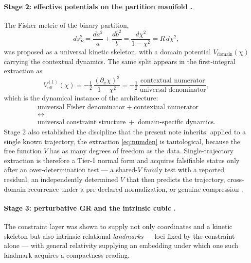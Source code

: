 \documentclass[11pt,a4paper]{article}
\theoremstyle{definition}
\theoremstyle{plain}
\theoremstyle{remark}
\newcommand{\Rresp}{R}
\newcommand{\lin}{{(1)}}
\begin{document}
\paragraph{Stage 2: effective potentials on the partition manifold \cite{EffPot}.}
The Fisher metric of the binary partition,
\begin{equation}
ds_{F}^{2}=\frac{da^{2}}{a}+\frac{db^{2}}{b}
=\frac{d\chi^{2}}{1-\chi^{2}}
=\Rresp\,d\chi^{2},
\label{eq:fisher}
\end{equation}
was proposed as a universal kinetic skeleton, with a domain potential
$V_{\mathrm{domain}}(\chi)$ carrying the contextual dynamics. The same split
appears in the first-integral extraction as
\begin{equation}
V^{\lin}_{\mathrm{eff}}(\chi)
= -\tfrac12\,\frac{(\partial_{x}\chi)^{2}}{1-\chi^{2}}
= -\tfrac12\,
\frac{\text{contextual numerator}}{\text{universal denominator}} ,
\label{eq:numden}
\end{equation}
which is the dynamical instance of the architecture:
\begin{equation}
\begin{gathered}
\text{universal Fisher denominator}\;+\;\text{contextual numerator}\\
\longleftrightarrow\\
\text{universal constraint structure}\;+\;\text{domain-specific dynamics}.
\end{gathered}
\end{equation}
Stage 2 also established the discipline that the present note inherits: applied
to a single known trajectory, the extraction \eqref{eq:numden} is tautological,
because the free function $V$ has as many degrees of freedom as the data.
Single-trajectory extraction is therefore a Tier-1 normal form and acquires
falsifiable status only after an over-determination test --- a shared-$V$ family
test with a reported residual, an independently determined $V$ that then
predicts the trajectory, cross-domain recurrence under a pre-declared
normalization, or genuine compression \cite{EffPot}.

\paragraph{Stage 3: perturbative GR and the intrinsic cubic
\cite{CubicThreshold,IntrinsicCubic,ReverseThales}.}
The constraint layer was shown to supply not only coordinates and a kinetic
skeleton but also intrinsic relational \emph{landmarks} --- loci fixed by the
constraint alone --- with general relativity supplying an embedding under which
one such landmark acquires a compactness reading.
\end{document}
